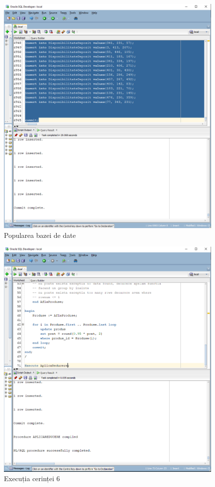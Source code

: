 \documentclass[12pt]{article}
\begin{document}
\begin{figure}[htp]
\centering
\includegraphics[width=1\linewidth]{Populare.png}
\caption{Popularea bazei de date}
\end{figure}

\begin{figure}[htp]
\centering
\includegraphics[width=1\linewidth]{Cerinta6.png}
\caption{Execuția cerinței 6}
\end{figure}
\end{document}
